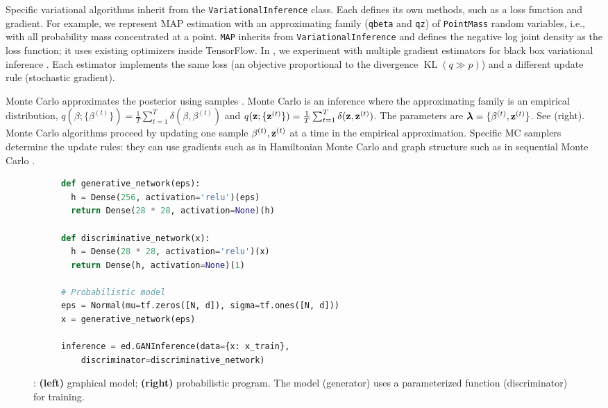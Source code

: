 Specific variational algorithms inherit from the
\texttt{VariationalInference} class.  Each defines its own methods,
such as a loss function and gradient.
For example, we represent
\gls{MAP}
estimation with an approximating family (\texttt{qbeta} and
\texttt{qz}) of \texttt{PointMass} random variables, i.e., with all
probability mass concentrated at a point.
\texttt{MAP} inherits from \texttt{VariationalInference} and defines
the negative log joint density as the loss function; it uses existing optimizers inside
TensorFlow.
In , we experiment with multiple gradient estimators
for black box variational inference \citep{ranganath:2014}. Each
estimator implements the same loss (an objective proportional to
the divergence $\operatorname{KL}(q\gg p)$) and a different update rule
(stochastic gradient).

Monte Carlo approximates the posterior using samples
\citep{robert1999monte}. Monte Carlo is an inference where the
approximating family is an empirical distribution,
$q(\beta; \{\beta^{(t)}\}) = \frac{1}{T}\sum_{t=1}^T \delta(\beta,
\beta^{(t)})$ and
$q(\boldsymbol{\mathbf{z}}; \{\boldsymbol{\mathbf{z}}^{(t)}\}) = \frac{1}{T}\sum_{t=1}^T \delta(\boldsymbol{\mathbf{z}},
\boldsymbol{\mathbf{z}}^{(t)})$. The parameters are
$\boldsymbol{\mathbf{\lambda}}=\{\beta^{(t)},\boldsymbol{\mathbf{z}}^{(t)}\}$.  See 
(right).
Monte Carlo algorithms proceed by updating one sample
$\beta^{(t)},\boldsymbol{\mathbf{z}}^{(t)}$ at a time in the empirical approximation.
Specific \gls{MC} samplers determine the update rules:
they can use gradients such as in Hamiltonian Monte Carlo
\citep{neal2011mcmc} and graph
structure such as in sequential Monte Carlo \citep{doucet2001introduction}.



\begin{figure}[tb]
\begin{subfigure}{0.4\columnwidth}
  \centering
  
\end{subfigure}%
\begin{subfigure}{0.6\columnwidth}
  \centering
\begin{lstlisting}[language=python]
def generative_network(eps):
  h = Dense(256, activation='relu')(eps)
  return Dense(28 * 28, activation=None)(h)

def discriminative_network(x):
  h = Dense(28 * 28, activation='relu')(x)
  return Dense(h, activation=None)(1)

# Probabilistic model
eps = Normal(mu=tf.zeros([N, d]), sigma=tf.ones([N, d]))
x = generative_network(eps)

inference = ed.GANInference(data={x: x_train},
    discriminator=discriminative_network)
\end{lstlisting}
\end{subfigure}
\caption{:
\textbf{(left)} graphical model; \textbf{(right)} probabilistic program.
The model (generator) uses a parameterized function (discriminator)
for training.
}
\label{fig:gan}
\end{figure}

